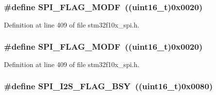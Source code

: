 \subsubsection[{\texorpdfstring{S\+P\+I\+\_\+\+F\+L\+A\+G\+\_\+\+M\+O\+DF}{SPI_FLAG_MODF}}]{\setlength{\rightskip}{0pt plus 5cm}\#define S\+P\+I\+\_\+\+F\+L\+A\+G\+\_\+\+M\+O\+DF~(({\bf uint16\+\_\+t})0x0020)}\hypertarget{group___s_p_i___i2_s__flags__definition_gac7d3525ab98cc18f02270a4dba685897}{}\label{group___s_p_i___i2_s__flags__definition_gac7d3525ab98cc18f02270a4dba685897}


Definition at line 409 of file stm32f10x\+\_\+spi.\+h.

\subsubsection[{\texorpdfstring{S\+P\+I\+\_\+\+F\+L\+A\+G\+\_\+\+M\+O\+DF}{SPI_FLAG_MODF}}]{\setlength{\rightskip}{0pt plus 5cm}\#define S\+P\+I\+\_\+\+F\+L\+A\+G\+\_\+\+M\+O\+DF~(({\bf uint16\+\_\+t})0x0020)}\hypertarget{group___s_p_i___i2_s__flags__definition_gac7d3525ab98cc18f02270a4dba685897}{}\label{group___s_p_i___i2_s__flags__definition_gac7d3525ab98cc18f02270a4dba685897}


Definition at line 409 of file stm32f10x\+\_\+spi.\+h.

\subsubsection[{\texorpdfstring{S\+P\+I\+\_\+\+I2\+S\+\_\+\+F\+L\+A\+G\+\_\+\+B\+SY}{SPI_I2S_FLAG_BSY}}]{\setlength{\rightskip}{0pt plus 5cm}\#define S\+P\+I\+\_\+\+I2\+S\+\_\+\+F\+L\+A\+G\+\_\+\+B\+SY~(({\bf uint16\+\_\+t})0x0080)}\hypertarget{group___s_p_i___i2_s__flags__definition_ga4551095df1365cf2a760282a34279b3c}{}\label{group___s_p_i___i2_s__flags__definition_ga4551095df1365cf2a760282a34279b3c}


